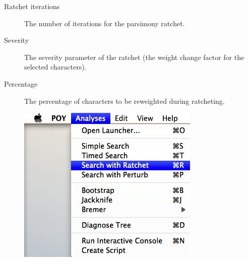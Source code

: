 {\begin{description}
    \item[Ratchet iterations] The number of iterations for the parsimony
        ratchet.
    \item[Severity] The severity parameter of the ratchet (the weight
        change factor for the selected characters).
    \item[Percentage] The percentage of characters to be reweighted during ratcheting.
\end{description}

\begin{figure}
\centering
\begin{minipage}[c]{0.45\textwidth}
   		\includegraphics[width=\textwidth]{doc/figures/searchwithratchet_menu.jpg}
\end{minipage}
\,
\begin{minipage}[c]{0.52\textwidth}

\end{minipage}
\end{figure}}
